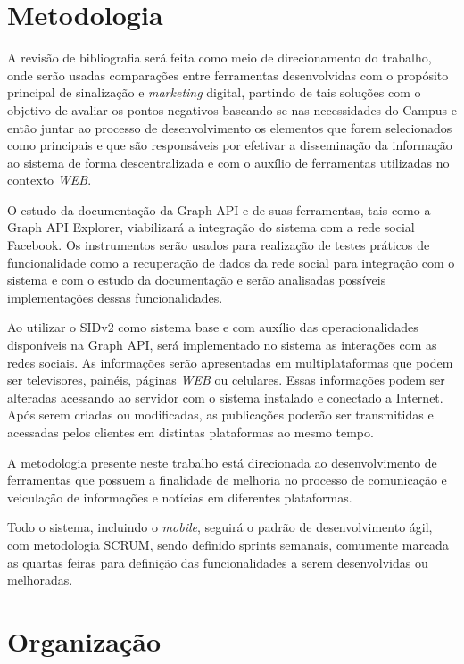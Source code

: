 \section{Metodologia}
A revisão de bibliografia será feita como meio de direcionamento do trabalho, onde serão usadas comparações entre ferramentas desenvolvidas com o propósito principal de sinalização e \textit{marketing} digital, partindo de tais soluções com o objetivo de avaliar os pontos negativos baseando-se nas necessidades do Campus e então juntar ao processo de desenvolvimento os elementos que forem selecionados como principais e que são responsáveis por efetivar a disseminação da informação ao sistema de forma descentralizada e com o auxílio de ferramentas utilizadas no contexto \textit{WEB}.

O estudo da documentação da Graph API e de suas ferramentas, tais como a Graph API Explorer, viabilizará a integração do sistema com a rede social Facebook. Os instrumentos serão usados para realização de testes práticos de funcionalidade como a recuperação de dados da rede social para integração com o sistema e com o estudo da documentação e serão analisadas possíveis implementações dessas funcionalidades.
	 
Ao utilizar o SIDv2 como sistema base e com auxílio das operacionalidades  disponíveis na Graph API, será implementado no sistema as interações com as redes sociais. As informações serão apresentadas em multiplataformas que podem ser televisores, painéis, páginas \textit{WEB} ou celulares. Essas informações podem ser alteradas acessando ao servidor com o sistema instalado e conectado a Internet. Após serem criadas ou modificadas, as publicações poderão ser transmitidas e acessadas pelos clientes em distintas plataformas ao mesmo tempo.

A metodologia presente neste trabalho está direcionada ao desenvolvimento de ferramentas que possuem a finalidade de melhoria no processo de comunicação e veiculação de informações e notícias em diferentes plataformas. 

Todo o sistema, incluindo o \textit{mobile}, seguirá o padrão de desenvolvimento ágil, com metodologia SCRUM, sendo definido sprints semanais, comumente marcada as quartas feiras para definição das funcionalidades a serem desenvolvidas ou melhoradas. 

\section{Organização}

